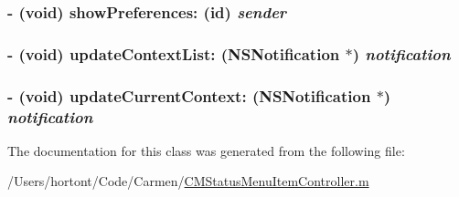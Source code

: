 \hypertarget{interface_c_m_status_menu_item_controller_07_p_r_i_v_a_t_e_08_e7e1a5e5777596a1344f0dc3f59e153f}{
\subsubsection[showPreferences:]{\setlength{\rightskip}{0pt plus 5cm}- (void) showPreferences: (id) {\em sender}}}
\label{interface_c_m_status_menu_item_controller_07_p_r_i_v_a_t_e_08_e7e1a5e5777596a1344f0dc3f59e153f}


\hypertarget{interface_c_m_status_menu_item_controller_07_p_r_i_v_a_t_e_08_e782d8e2f6c8a7a6f946f3252c18c9f3}{
\subsubsection[updateContextList:]{\setlength{\rightskip}{0pt plus 5cm}- (void) updateContextList: (NSNotification $\ast$) {\em notification}}}
\label{interface_c_m_status_menu_item_controller_07_p_r_i_v_a_t_e_08_e782d8e2f6c8a7a6f946f3252c18c9f3}


\hypertarget{interface_c_m_status_menu_item_controller_07_p_r_i_v_a_t_e_08_7e84d9910082dad2325514a73e3ef728}{
\subsubsection[updateCurrentContext:]{\setlength{\rightskip}{0pt plus 5cm}- (void) updateCurrentContext: (NSNotification $\ast$) {\em notification}}}
\label{interface_c_m_status_menu_item_controller_07_p_r_i_v_a_t_e_08_7e84d9910082dad2325514a73e3ef728}




The documentation for this class was generated from the following file:\begin{CompactItemize}
\item 
/Users/hortont/Code/Carmen/\hyperlink{_c_m_status_menu_item_controller_8m}{CMStatusMenuItemController.m}\end{CompactItemize}

